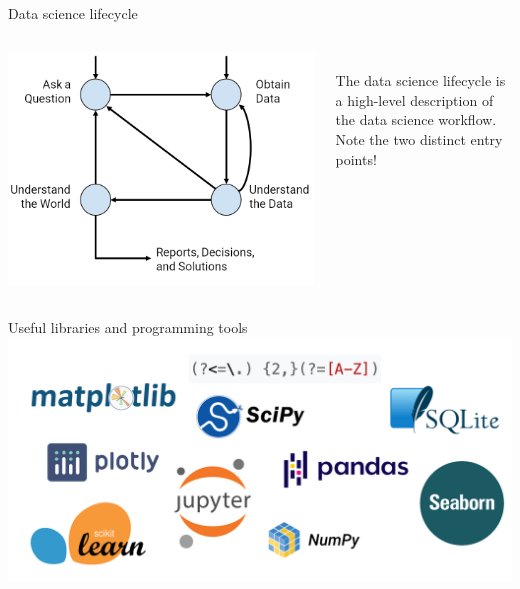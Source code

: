 \documentclass[aspectratio=169]{../latex_main/tntbeamer}  %
\begin{document}
	
	\begin{frame}{Data science lifecycle}
	    \begin{columns}
	      \begin{column}{.5\textwidth}
	              \begin{center}
	                  \includegraphics[scale=.35]{Bild13}
	              \end{center}
	      \end{column}
	      
	      
	      \begin{column}{.5\textwidth}
	              \vspace{2cm}
	              \\The data science lifecycle is a high-level description of the data science workflow.\\
                  \bigskip
                  Note the two distinct entry points!
	      \end{column}
	    \end{columns}
	\end{frame}
	
	
	
	\begin{frame}{Useful libraries and programming tools}
	    \centering
	    \includegraphics[scale=.35]{Bild14}
	\end{frame}
\end{document}
